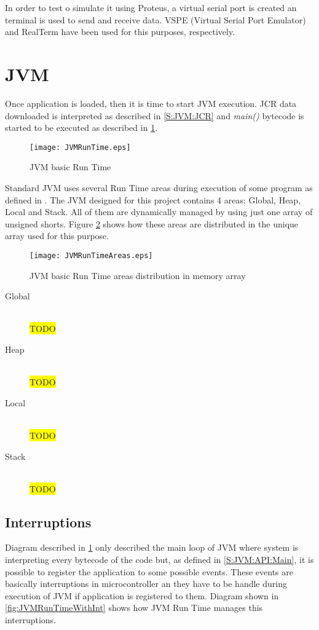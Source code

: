 In order to test o simulate it using Proteus, a virtual serial port is created an terminal is used to send and receive data. VSPE (Virtual Serial Port Emulator) and RealTerm have been used for this purposes, respectively.

\section{JVM}\label{S:JVM:RunTime}
Once application is loaded, then it is time to start JVM execution. JCR data downloaded is interpreted as described in \ref{S:JVM:JCR} and \textit{main()} bytecode is started to be executed as described in \ref{fig:JVMRunTime}.

\begin{figure}[H]
\centering
\texttt{[image: JVMRunTime.eps]}
\caption{JVM basic Run Time}
\label{fig:JVMRunTime}
\end{figure}

Standard JVM uses several Run Time areas during execution of some program as defined in \cite{Art:JVMSE7}. The JVM designed for this project contains 4 areas: Global, Heap, Local and Stack. All of them are dynamically managed by using just one array of unsigned shorts. Figure \ref{fig:JVMRunTimeAreas} shows how these areas are distributed in the unique array used for this purpose.

\begin{figure}[H]
\centering
\texttt{[image: JVMRunTimeAreas.eps]}
\caption{JVM basic Run Time areas distribution in memory array}
\label{fig:JVMRunTimeAreas}
\end{figure}

\begin{description}
\item[Global] \hfill \\
\colorbox{yellow}{TODO}
\item[Heap] \hfill \\
\colorbox{yellow}{TODO}
\item[Local] \hfill \\
\colorbox{yellow}{TODO}
\item[Stack] \hfill \\
\colorbox{yellow}{TODO}
\end{description}

\subsection{Interruptions}\label{SS:JVM:RunTime:Int}
Diagram described in \ref{fig:JVMRunTime} only described the main loop of JVM where system is interpreting every bytecode of the code but, as defined in \ref{S:JVM:API:Main}, it is possible to register the application to some possible events. These events are basically interruptions in microcontroller an they have to be handle during execution of JVM if application is registered to them. Diagram shown in \ref{fig:JVMRunTimeWithInt} shows how JVM Run Time manages this interruptions.

